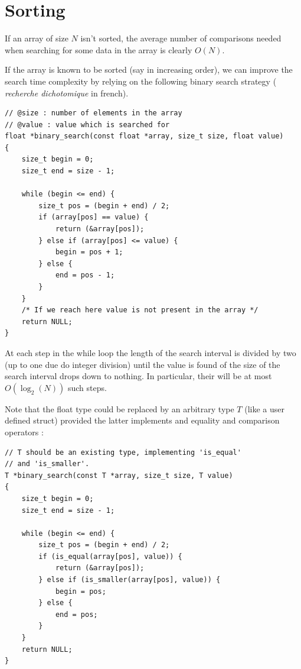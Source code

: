\documentclass[12pt]{article}
\theoremstyle{plain}
\theoremstyle{remark}
\begin{document}
\section{Sorting}\label{sec:sort}

If an array of size $N$ isn't sorted, the average number of comparisons needed
when searching for some data in the array is clearly $O(N).$ 

If the array is known to be sorted (say in increasing order), we can improve the
search time complexity by relying on the following binary search strategy ({\it
recherche dichotomique} in french).

\begin{lstlisting}[style=C]
// @size : number of elements in the array
// @value : value which is searched for
float *binary_search(const float *array, size_t size, float value)
{
	size_t begin = 0;
	size_t end = size - 1;

	while (begin <= end) {
		size_t pos = (begin + end) / 2;
		if (array[pos] == value) {
			return (&array[pos]);
		} else if (array[pos] <= value) {
			begin = pos + 1;
		} else {
			end = pos - 1;
		}
	}
	/* If we reach here value is not present in the array */
	return NULL;
}
\end{lstlisting}

At each step in the while loop the length of the search interval is divided by
two (up to one due do integer division) until the value is found of the size of
the search interval drops down to nothing. In particular, their will be at most
$O(\log_2(N))$ such steps. 

Note that the float type could be replaced by an arbitrary type $T$ (like a user
defined struct) provided the latter implements and equality and comparison 
operators : 

\begin{lstlisting}[style=C]
// T should be an existing type, implementing 'is_equal' 
// and 'is_smaller'.
T *binary_search(const T *array, size_t size, T value)
{
	size_t begin = 0;
	size_t end = size - 1;

	while (begin <= end) {
		size_t pos = (begin + end) / 2;
		if (is_equal(array[pos], value)) {
			return (&array[pos]);
		} else if (is_smaller(array[pos], value)) {
			begin = pos;
		} else {
			end = pos;
		}
	}
	return NULL;
}
\end{lstlisting}
\end{document}

